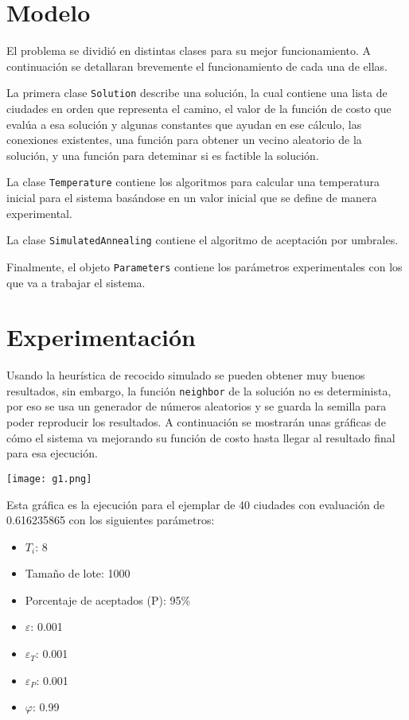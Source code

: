 \documentclass[12px]{article}
\begin{document}
\section{Modelo}
El problema se dividió en distintas clases para su mejor funcionamiento. A continuación se detallaran brevemente el funcionamiento de cada una de ellas.\\ \par

La primera clase \texttt{Solution} describe una solución, la cual contiene una lista de ciudades en orden que representa el camino, el valor de la función de costo que evalúa a esa solución y algunas constantes que ayudan en ese cálculo, las conexiones existentes, una función para obtener un vecino aleatorio de la solución, y una función para deteminar si es factible la solución. \\ \par

La clase \texttt{Temperature} contiene los algoritmos para calcular una temperatura inicial para el sistema basándose en un valor inicial que se define de manera experimental.\\ \par

La clase \texttt{SimulatedAnnealing} contiene el algoritmo de aceptación por umbrales.\\ \par

Finalmente, el objeto \texttt{Parameters} contiene los parámetros experimentales con los que va a trabajar el sistema.

\section{Experimentación}
Usando la heurística de recocido simulado se pueden obtener muy buenos resultados, sin embargo, la función \texttt{neighbor} de la solución no es determinista, por eso se usa un generador de números aleatorios y se guarda la semilla para poder reproducir los resultados. A continuación se mostrarán unas gráficas de cómo el sistema va mejorando su función de costo hasta llegar al resultado final para esa ejecución.

\texttt{[image: g1.png]}

Esta gráfica es la ejecución para el ejemplar de 40 ciudades con evaluación de 0.616235865 con los siguientes parámetros:\\
\begin{itemize}
\item $T_i$: 8
\item Tamaño de lote: 1000
\item Porcentaje de aceptados (P): 95\%
\item $\varepsilon$: 0.001
\item $\varepsilon_T$: 0.001
\item $\varepsilon_P$: 0.001
\item $\varphi$: 0.99
\end{itemize}
\end{document}
